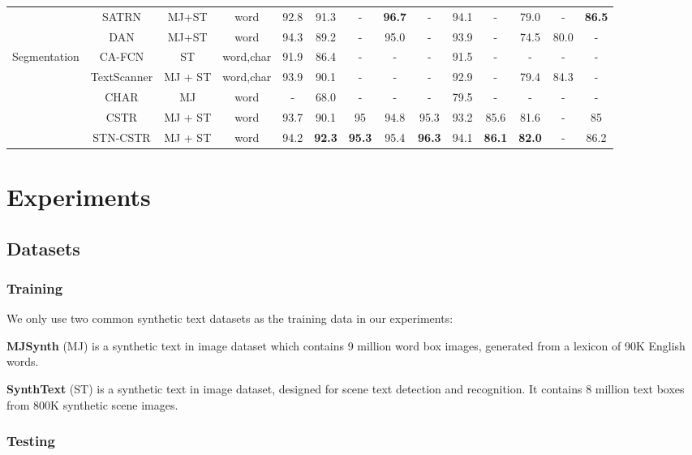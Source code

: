 \documentclass[final]{cvpr}
\begin{document}
\begin{table*}[ht]
{\begin{tabular}{ | c | c | c | c | c | c | c | c | c | c | c | c| c | c |}
		    &SATRN \cite{lee2020recognizing} & MJ+ST & word & 92.8 & 91.3 & - & \textbf{96.7} & - & 94.1 & - & 79.0 & - & \textbf{86.5}\\
		    & DAN \cite{wang2020decoupled} & MJ+ST & word & 94.3 & 89.2 & - & 95.0 & - & 93.9 & - & 74.5 & 80.0 & - \\
		\hline
		\multirow{3}{*}{Segmentation}
		    & CA-FCN \cite{liao2019scene} & ST & word,char & 91.9 & 86.4 & - & - & - & 91.5 & - & - & - & - \\ 
		    & TextScanner\cite{wan2020textscanner} & MJ + ST & word,char & 93.9 & 90.1 & - & - & - & 92.9 & - & 79.4 & 84.3 & - \\ 
		\hline
		\multirow{3}{*}{Classification}
		    & CHAR\cite{jaderberg14c} & MJ & word & - & 68.0 & - & - & - & 79.5 & - & - & - & - \\ 
		    & CSTR & MJ + ST & word & 93.7 & 90.1 & 95 & 94.8 & 95.3 & 93.2 & 85.6 & 81.6 & - & 85 \\ 
		    & STN-CSTR & MJ + ST & word & 94.2 & \textbf{92.3} & \textbf{95.3} & 95.4 & \textbf{96.3} & 94.1 & \textbf{86.1} & \textbf{82.0} & - & 86.2 \\
		\hline 
	\end{tabular}
	} 
\end{table*}

\section{Experiments}

\subsection{Datasets}


\subsubsection{Training}
We only use two common synthetic text datasets as the training data in our experiments:

\textbf{MJSynth} (MJ) \cite{jaderberg14c} is a synthetic text in image dataset which contains 9 million word box images, generated from a lexicon of 90K English words.

\textbf{SynthText} (ST) \cite{gupta2016synthetic} is a synthetic text in image dataset, designed for scene text detection and recognition. It contains 8 million text boxes from 800K synthetic scene images.
\subsubsection{Testing}
\end{document}

